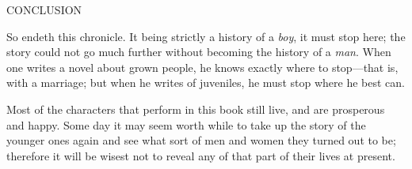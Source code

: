 \documentclass{book}
\begin{document}
CONCLUSION

So endeth this chronicle. It being strictly a history of a \emph{boy}, it must stop here; the story could not go much further without becoming the history of a \emph{man}. When one writes a novel about grown people, he knows exactly where to stop—that is, with a marriage; but when he writes of juveniles, he must stop where he best can.

Most of the characters that perform in this book still live, and are prosperous and happy. Some day it may seem worth while to take up the story of the younger ones again and see what sort of men and women they turned out to be; therefore it will be wisest not to reveal any of that part of their lives at present.
\end{document}

